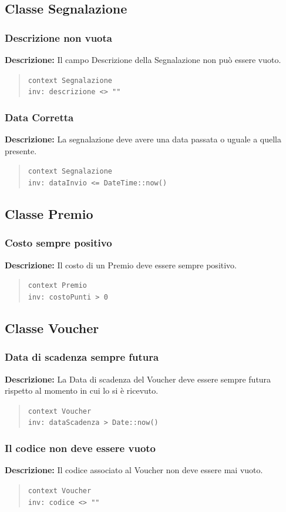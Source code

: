 \documentclass[12pt,a4paper]{article}
\begin{document}
\subsection{Classe Segnalazione}

\subsubsection{Descrizione non vuota} 
\textbf{Descrizione:} Il campo Descrizione della Segnalazione non può essere vuoto.
\begin{quote}
\texttt{context Segnalazione}  \\
\texttt{inv: descrizione <> ""} 
\end{quote}

\subsubsection{Data Corretta} 
\textbf{Descrizione:} La segnalazione deve avere una data passata o uguale a quella presente.
\begin{quote}
\texttt{context Segnalazione}  \\
\texttt{inv: dataInvio <= DateTime::now()} 
\end{quote}

\subsection{Classe Premio}

\subsubsection{Costo sempre positivo} 
\textbf{Descrizione:} Il costo di un Premio deve essere sempre positivo.
\begin{quote}
\texttt{context Premio}  \\
\texttt{inv: costoPunti > 0} 
\end{quote}

\subsection{Classe Voucher}

\subsubsection{Data di scadenza sempre futura} 
\textbf{Descrizione:} La Data di scadenza del Voucher deve essere sempre futura rispetto al momento in cui lo si è ricevuto.
\begin{quote}
\texttt{context Voucher}  \\
\texttt{inv: dataScadenza > Date::now()} 
\end{quote}

\subsubsection{Il codice non deve essere vuoto} 
\textbf{Descrizione:} Il codice associato al Voucher non deve essere mai vuoto.
\begin{quote}
\texttt{context Voucher}  \\
\texttt{inv: codice <> ""} 
\end{quote}
\end{document}
